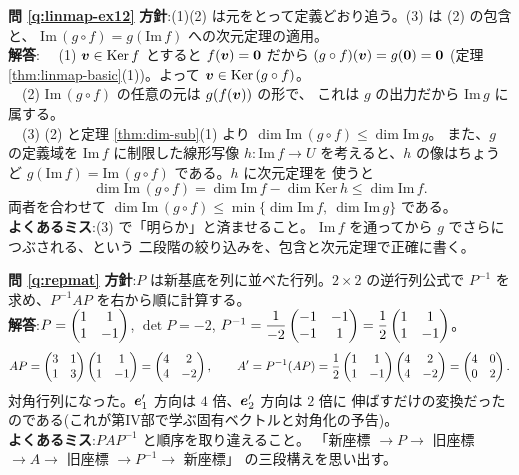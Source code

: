 \bigskip
\noindent\textbf{問 \ref{q:linmap-ex12}}\quad
\textbf{方針}:(1)(2) は元をとって定義どおり追う。(3) は (2) の包含と、
$\mathrm{Im}\,(g \circ f) = g(\mathrm{Im}\,f)$ への次元定理の適用。\\
\textbf{解答}:
　(1) $\bm{v} \in \mathrm{Ker}\,f$ とすると $f(\bm{v}) = \bm{0}$
だから $(g \circ f)(\bm{v}) = g(\bm{0}) = \bm{0}$
(定理 \ref{thm:linmap-basic}(1))。よって
$\bm{v} \in \mathrm{Ker}\,(g \circ f)$。\\
　(2) $\mathrm{Im}\,(g \circ f)$ の任意の元は $g(f(\bm{v}))$ の形で、
これは $g$ の出力だから $\mathrm{Im}\,g$ に属する。\\
　(3) (2) と定理 \ref{thm:dim-sub}(1) より
$\dim \mathrm{Im}\,(g \circ f) \le \dim \mathrm{Im}\,g$。
また、$g$ の定義域を $\mathrm{Im}\,f$ に制限した線形写像
$h : \mathrm{Im}\,f \to U$ を考えると、$h$ の像はちょうど
$g(\mathrm{Im}\,f) = \mathrm{Im}\,(g \circ f)$ である。$h$ に次元定理を
使うと
\[
\dim \mathrm{Im}\,(g \circ f) = \dim \mathrm{Im}\,f - \dim \mathrm{Ker}\,h
\le \dim \mathrm{Im}\,f.
\]
両者を合わせて
$\dim \mathrm{Im}\,(g \circ f) \le \min\{\dim \mathrm{Im}\,f,\
\dim \mathrm{Im}\,g\}$ である。\\
\textbf{よくあるミス}:(3) で「明らか」と済ませること。
$\mathrm{Im}\,f$ を通ってから $g$ でさらにつぶされる、という
二段階の絞り込みを、包含と次元定理で正確に書く。

\bigskip
\noindent\textbf{問 \ref{q:repmat}}\quad
\textbf{方針}:$P$ は新基底を列に並べた行列。$2 \times 2$ の逆行列公式で
$P^{-1}$ を求め、$P^{-1}AP$ を右から順に計算する。\\
\textbf{解答}:$P = \begin{pmatrix}1 & 1 \\ 1 & -1\end{pmatrix}$, $\det P = -2$,
$P^{-1} = \dfrac{1}{-2}\begin{pmatrix}-1 & -1 \\ -1 & 1\end{pmatrix} = \dfrac{1}{2}\begin{pmatrix}1 & 1 \\ 1 & -1\end{pmatrix}$。
\[
AP = \begin{pmatrix}3 & 1 \\ 1 & 3\end{pmatrix}\begin{pmatrix}1 & 1 \\ 1 & -1\end{pmatrix} = \begin{pmatrix}4 & 2 \\ 4 & -2\end{pmatrix},
\qquad
A' = P^{-1}(AP) = \frac{1}{2}\begin{pmatrix}1 & 1 \\ 1 & -1\end{pmatrix}\begin{pmatrix}4 & 2 \\ 4 & -2\end{pmatrix}
= \begin{pmatrix}4 & 0 \\ 0 & 2\end{pmatrix}.
\]
対角行列になった。$\bm{e}'_1$ 方向は $4$ 倍、$\bm{e}'_2$ 方向は $2$ 倍に
伸ばすだけの変換だったのである(これが第IV部で学ぶ固有ベクトルと対角化の予告)。\\
\textbf{よくあるミス}:$PAP^{-1}$ と順序を取り違えること。
「新座標 $\to P \to$ 旧座標 $\to A \to$ 旧座標 $\to P^{-1} \to$ 新座標」
の三段構えを思い出す。

